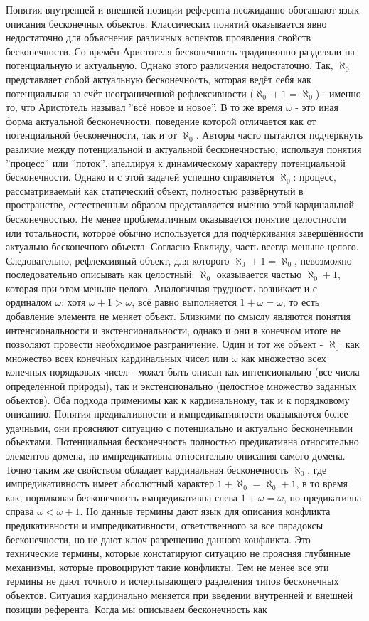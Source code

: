 \documentclass[12pt]{article}
\begin{document}
Понятия внутренней и внешней позиции референта неожиданно обогащают язык описания бесконечных объектов. Классических понятий оказывается явно недостаточно для объяснения различных аспектов проявления свойств бесконечности. Со времён Аристотеля бесконечность традиционно разделяли на потенциальную и актуальную. Однако этого различения недостаточно. Так, $\aleph_0$ представляет собой актуальную бесконечность, которая ведёт себя как потенциальная за счёт неограниченной рефлексивности ($\aleph_0 + 1 = \aleph_0$) - именно то, что Аристотель называл ''всё новое и новое''. В то же время $\omega$ - это иная форма актуальной бесконечности, поведение которой отличается как от потенциальной бесконечности, так и от $\aleph_0$. Авторы часто пытаются подчеркнуть различие между потенциальной и актуальной бесконечностью, используя понятия ''процесс'' или ''поток'', апеллируя к динамическому характеру потенциальной бесконечности. Однако и с этой задачей успешно справляется $\aleph_0$: процесс, рассматриваемый как статический объект, полностью развёрнутый в пространстве, естественным образом представляется именно этой кардинальной бесконечностью. Не менее проблематичным оказывается понятие целостности или тотальности, которое обычно используется для подчёркивания завершённости актуально бесконечного объекта. Согласно Евклиду, часть всегда меньше целого. Следовательно, рефлексивный объект, для которого $\aleph_0 + 1 = \aleph_0$, невозможно последовательно описывать как целостный: $\aleph_0$ оказывается частью $\aleph_0 + 1$, которая при этом меньше целого. Аналогичная трудность возникает и с ординалом $\omega$: хотя $\omega + 1 > \omega$, всё равно выполняется $1 + \omega = \omega$, то есть добавление элемента не меняет объект. Близкими по смыслу являются понятия интенсиональности и экстенсиональности, однако и они в конечном итоге не позволяют провести необходимое разграничение. Один и тот же объект - $\aleph_0$ как множество всех конечных кардинальных чисел или $\omega$ как множество всех конечных порядковых чисел - может быть описан как интенсионально (все числа определённой природы), так и экстенсионально (целостное множество заданных объектов). Оба подхода применимы как к кардинальному, так и к порядковому описанию. Понятия предикативности и импредикативности оказываются более удачными, они проясняют ситуацию с потенциально и актуально бесконечными объектами. Потенциальная бесконечность полностью предикативна относительно элементов домена, но импредикативна относительно описания самого домена. Точно таким же свойством обладает кардинальная бесконечность $\aleph_0$, где импредикативность имеет абсолютный характер $1 + \aleph_0 = \aleph_0 + 1$, в то время как, порядковая бесконечность импредикативна слева $1 + \omega = \omega$, но предикативна справа $\omega < \omega + 1$. Но данные термины дают язык для описания конфликта предикативности и импредикативности, ответственного за все парадоксы бесконечности, но не дают ключ разрешению данного конфликта. Это технические термины, которые констатируют ситуацию не проясняя глубинные механизмы, которые провоцируют такие конфликты. Тем не менее все эти термины не дают точного и исчерпывающего разделения типов бесконечных объектов. Ситуация кардинально меняется при введении внутренней и внешней позиции референта. Когда мы описываем бесконечность как 
\end{document}
